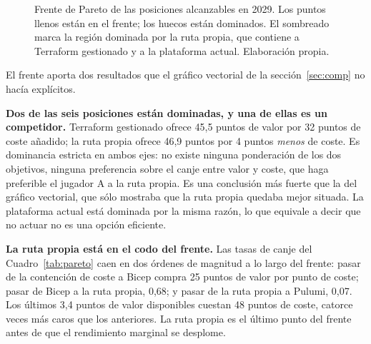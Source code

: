 \documentclass[11pt,letterpaper]{article}
\begin{document}
\begin{figure}[ht]
  \caption{Frente de Pareto de las posiciones alcanzables en 2029. Los puntos
  llenos están en el frente; los huecos están dominados. El sombreado marca la
  región dominada por la ruta propia, que contiene a Terraform gestionado y a
  la plataforma actual. Elaboración propia.}
  \label{fig:pareto}
\end{figure}

El frente aporta dos resultados que el gráfico vectorial de la
sección~\ref{sec:comp} no hacía explícitos.

\textbf{Dos de las seis posiciones están dominadas, y una de ellas es un
competidor.} Terraform gestionado ofrece 45,5 puntos de valor por 32 puntos
de coste añadido; la ruta propia ofrece 46,9 puntos por 4 puntos \emph{menos}
de coste. Es dominancia estricta en ambos ejes: no existe ninguna
ponderación de los dos objetivos, ninguna preferencia sobre el canje entre
valor y coste, que haga preferible el jugador A a la ruta propia. Es una
conclusión más fuerte que la del gráfico vectorial, que sólo mostraba que la
ruta propia quedaba mejor situada. La plataforma actual está dominada por la
misma razón, lo que equivale a decir que no actuar no es una opción eficiente.

\textbf{La ruta propia está en el codo del frente.} Las tasas de canje del
Cuadro~\ref{tab:pareto} caen en dos órdenes de magnitud a lo largo del
frente: pasar de la contención de coste a Bicep compra 25 puntos de valor por
punto de coste; pasar de Bicep a la ruta propia, 0,68; y pasar de la ruta
propia a Pulumi, 0,07. Los últimos 3,4 puntos de valor disponibles cuestan 48
puntos de coste, catorce veces más caros que los anteriores. La ruta propia es
el último punto del frente antes de que el rendimiento marginal se desplome.
\end{document}

